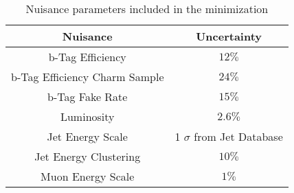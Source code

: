 \begin{table}[htb]
\begin{center}
\small
\begin{tabular}{|c|c|}
\hline
Nuisance&Uncertainty\\
\hline
b-Tag Efficiency& $12\%$\\
b-Tag Efficiency Charm Sample& $24\%$\\
b-Tag Fake Rate& $15\%$\\
Luminosity& $2.6\%$\\
Jet Energy Scale& 1 $\sigma$ from Jet Database\\
Jet Energy Clustering& $10\%$\\
Muon Energy Scale& $1\%$\\
\hline
\end{tabular}
\caption{Nuisance parameters included in the minimization}%
\label{tab:NuisanceTable}
\end{center}
\end{table}



